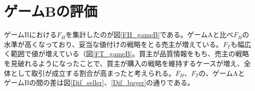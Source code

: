 \documentclass[a4paper,fontsize=11pt,report,notitlepage,line_length=38zw,number_of_lines=40,dvipdfmx]{jlreq}
\begin{document}
\section{ゲームBの評価}
ゲームBにおける$F_H$を集計したのが図\ref{FH_gameB}である。ゲームAと比べ$F_H$の水準が高くなっており、妥当な値付けの戦略をとる売主が増えている。$F_T$も幅広く範囲で値が増えている（図\ref{FT_gameB}。買主が品質情報をもち、売主の戦略を見破れるようになったことで、買主が購入の戦略を維持するケースが増え、全体として取引が成立する割合が高まったと考えられる。$F_H$、$F_T$の、ゲームAとゲームBの間の差は図\ref{Dif_seller}、\ref{Dif_buyer}の通りである。

\end{document}
